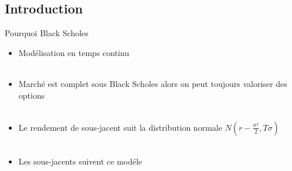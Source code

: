 \documentclass[10pt]{beamer}
\begin{document}
\subsection{Introduction}


\begin{frame}{Pourquoi Black Scholes}{}
  \begin{itemize}
    \item Modélisation en temps continu\\~\\
    \item Marché est complet sous Black Scholes alors on peut toujours valoriser des options\\~\\
    \item Le rendement de sous-jacent suit la distribution normale  $N(r-\frac{\sigma^{2}}{2}, T\sigma)$\\~\\
    \item Les sous-jacents suivent ce modéle  \\~\\
    
    
  \end{itemize}
  
 \begin{figure}[t]
\centering


\end{figure}

\end{frame}
\end{document}
